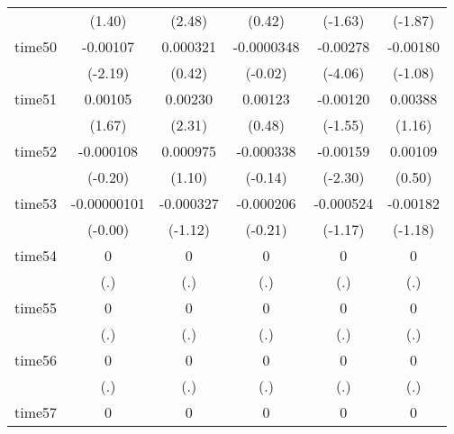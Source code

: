 \begin{table}[htbp]
\begin{tabular}{l*{5}{c}}
            &      (1.40)         &      (2.48)         &      (0.42)         &     (-1.63)         &     (-1.87)         \\
time50      &    -0.00107\sym{*}  &    0.000321         &  -0.0000348         &    -0.00278\sym{***}&    -0.00180         \\
            &     (-2.19)         &      (0.42)         &     (-0.02)         &     (-4.06)         &     (-1.08)         \\
time51      &     0.00105         &     0.00230\sym{*}  &     0.00123         &    -0.00120         &     0.00388         \\
            &      (1.67)         &      (2.31)         &      (0.48)         &     (-1.55)         &      (1.16)         \\
time52      &   -0.000108         &    0.000975         &   -0.000338         &    -0.00159\sym{*}  &     0.00109         \\
            &     (-0.20)         &      (1.10)         &     (-0.14)         &     (-2.30)         &      (0.50)         \\
time53      & -0.00000101         &   -0.000327         &   -0.000206         &   -0.000524         &    -0.00182         \\
            &     (-0.00)         &     (-1.12)         &     (-0.21)         &     (-1.17)         &     (-1.18)         \\
time54      &           0         &           0         &           0         &           0         &           0         \\
            &         (.)         &         (.)         &         (.)         &         (.)         &         (.)         \\
time55      &           0         &           0         &           0         &           0         &           0         \\
            &         (.)         &         (.)         &         (.)         &         (.)         &         (.)         \\
time56      &           0         &           0         &           0         &           0         &           0         \\
            &         (.)         &         (.)         &         (.)         &         (.)         &         (.)         \\
time57      &           0         &           0         &           0         &           0         &           0         \\

\end{tabular}
\end{table}
